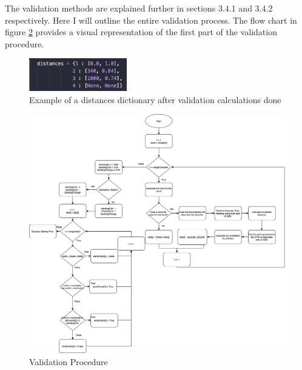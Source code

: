 \documentclass[10pt,a4paper]{report}
\begin{document}
The validation methods are explained further in sections 3.4.1 and 3.4.2 respectively. Here I will outline the entire validation process. The flow chart in figure \ref{fig:valProc} provides a visual representation of the first part of the validation procedure.

\begin{figure}
	\begin{center}
		\includegraphics[width=0.38\textwidth]{DistancesDict}
	\end{center}
	\caption{Example of a distances dictionary after validation calculations done}
	\label{fig:distances}
\end{figure}

\begin{figure}
	\centering
	\includegraphics[scale=0.3]{ValidationProc}
	\caption{Validation Procedure}
	\label{fig:valProc}
\end{figure}
\end{document}
